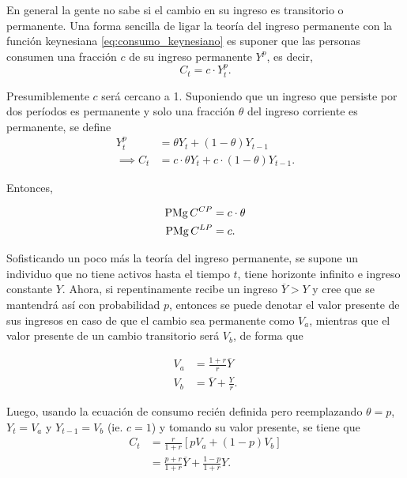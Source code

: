 \documentclass[DeGregorioResumen]{subfiles}
\begin{document}
En general la gente no sabe si el cambio en su ingreso es transitorio o permanente. Una forma sencilla de ligar la teoría del ingreso permanente con la función keynesiana \eqref{eq:consumo_keynesiano} es suponer que las personas consumen una fracción $c$ de su ingreso permanente $Y^p$, es decir,
\begin{equation*}
C_t=c\cdot Y^p_t.
\end{equation*}

Presumiblemente $c$ será cercano a 1. Suponiendo que un ingreso que persiste por dos períodos es permanente y solo una fracción $\theta$ del ingreso corriente es permanente, se define
\begin{align*}
Y^p_t &= \theta Y_t+(1-\theta)Y_{t-1} \\
\implies C_t &= c\cdot \theta Y_t+c\cdot(1-\theta)Y_{t-1}.
\end{align*}

Entonces,

\begin{align*}
\operatorname{PMg} C^{CP} &= c\cdot\theta \\
\operatorname{PMg} C^{LP} &= c.
\end{align*}

Sofisticando un poco más la teoría del ingreso permanente, se supone un individuo que no tiene activos hasta el tiempo $t$, tiene horizonte infinito e ingreso constante $Y$. Ahora, si repentinamente recibe un ingreso $\overline{Y}>Y$ y cree que se mantendrá así con probabilidad $p$, entonces se puede denotar el valor presente de sus ingresos en caso de que el cambio sea permanente como $V_a$, mientras que el valor presente de un cambio transitorio será $V_b$, de forma que

\begin{align*}
V_a &= \frac{1+r}{r}\overline{Y} \\
V_b &= \overline{Y}+\frac{Y}{r}.
\end{align*}

Luego, usando la ecuación de consumo recién definida pero reemplazando $\theta=p$, $Y_t=V_a$ y $Y_{t-1}=V_b$ (ie. $c=1$) y tomando su valor presente, se tiene que
\begin{align*}
C_t &= \frac{r}{1+r}\left[pV_a+(1-p)V_b\right] \\
&= \frac{p+r}{1+r}\overline{Y}+\frac{1-p}{1+r}Y.
\end{align*}
\end{document}
